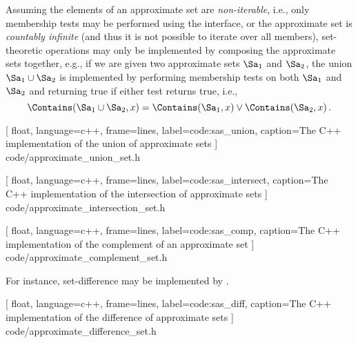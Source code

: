 \documentclass[ ../main.tex]{subfiles}
\begin{document}
Assuming the elements of an approximate set are \emph{non-iterable}, i.e., only membership tests may be performed using the \Contains interface, or the approximate set is \emph{countably infinite} (and thus it is not possible to iterate over all members), set-theoretic operations may only be implemented by composing the approximate sets together, e.g., if we are given two approximate sets $\Sa_1$ and $\Sa_2$, the union $\Sa_1 \cup \Sa_2$ is implemented by performing membership tests on both $\Sa_1$ and $\Sa_2$ and returning true if either test returns true, i.e.,
\begin{equation}
    \Contains(\Sa_1 \cup \Sa_2, x) = \Contains(\Sa_1, x) \lor \Contains(\Sa_2, x)\,.
\end{equation}


[
    float,
    language=c++,
    frame=lines,
    label={code:sas_union},
    caption={The C++ implementation of the union of approximate sets}
]
{code/approximate_union_set.h}


[
    float,
    language=c++,
    frame=lines,
    label={code:sas_intersect},
    caption={The C++ implementation of the intersection of approximate sets}
]
{code/approximate_intersection_set.h}


[
    float,
    language=c++,
    frame=lines,
    label={code:sas_comp},
    caption={The C++ implementation of the complement of an approximate set}
]
{code/approximate_complement_set.h}

For instance, set-difference may be implemented by .

[
    float,
    language=c++,
    frame=lines,
    label={code:sas_diff},
    caption={The C++ implementation of the difference of approximate sets}
]
{code/approximate_difference_set.h}
\end{document}

